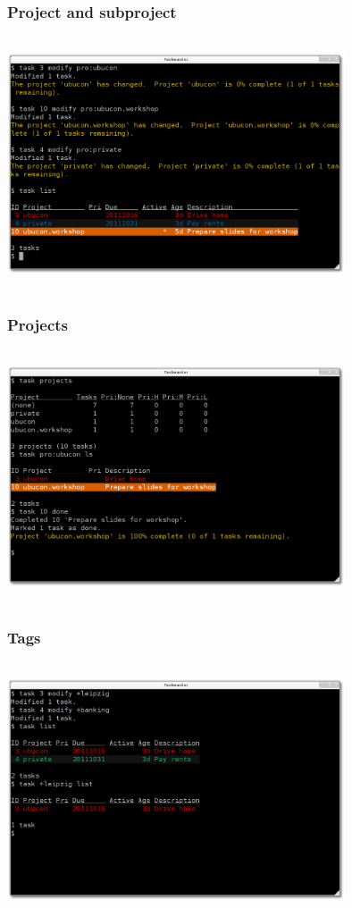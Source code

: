 \documentclass[t,handout]{beamer}
\begin{document}
\begin{frame}
\frametitle{Project and subproject}
\begin{center}
\includegraphics[width=10cm,height=7.5cm]{project_and_subproject.png}
\end{center}
\end{frame}

\begin{frame}
\frametitle{Projects}
\begin{center}
\includegraphics[width=10cm,height=7.5cm]{projects.png}
\end{center}
\end{frame}

\begin{frame}
\frametitle{Tags}
\begin{center}
\includegraphics[width=10cm,height=7.5cm]{tags.png}
\end{center}
\end{frame}
\end{document}
